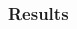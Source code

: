 \documentclass{beamer}
\begin{document}
\begin{frame}
\frametitle{Results}
\begin{columns}
\begin{column}{5cm}
\begin{figure}
   \end{figure}
   \end{column}
   \begin{column}{5cm}
\begin{figure}
   \end{figure}
   \end{column}
   \end{columns}
   
\end{frame} 
\end{document}
